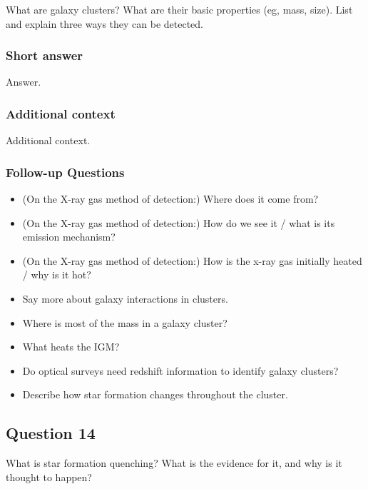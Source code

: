 \documentclass[a4paper,11pt]{article}
\begin{document}
What are galaxy clusters? What are their basic properties (eg, mass, size). List and explain three ways they can be detected.

\subsubsection{Short answer}

Answer.

\subsubsection{Additional context}

Additional context.

\subsubsection{Follow-up Questions}

\begin{itemize}
    \item (On the X-ray gas method of detection:) Where does it come from?
    \item (On the X-ray gas method of detection:) How do we see it / what is its emission mechanism?
    \item (On the X-ray gas method of detection:) How is the x-ray gas initially heated / why is it hot?
    \item Say more about galaxy interactions in clusters.
    \item Where is most of the mass in a galaxy cluster?
    \item What heats the IGM?
    \item Do optical surveys need redshift information to identify galaxy clusters?
    \item Describe how star formation changes throughout the cluster.
    \end{itemize}




\newpage
\subsection{Question 14}

What is star formation quenching? What is the evidence for it, and why is it thought to happen?
\end{document}
